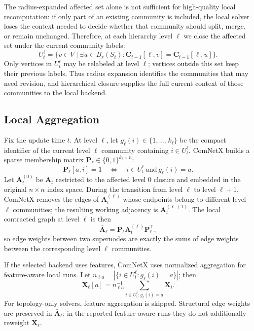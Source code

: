 \documentclass[conference]{IEEEtran}
\theoremstyle{definition}
\begin{document}
The radius-expanded affected set alone is not sufficient for high-quality local
recomputation: if only part of an existing community is included, the local
solver loses the context needed to decide whether that community should split,
merge, or remain unchanged. Therefore, at each hierarchy level $\ell$ we close
the affected set under the current community labels:
\begin{equation*}
U_t^\ell =
\{v\in V \mid \exists u\in B_r(S_t):
\mathbf{C}_{t-1}[\ell,v]=\mathbf{C}_{t-1}[\ell,u]\}.
\end{equation*}
Only vertices in $U_t^\ell$ may be relabeled at level $\ell$; vertices outside
this set keep their previous labels. Thus radius expansion identifies the
communities that may need revision, and hierarchical closure supplies the full
current context of those communities to the local backend.

\subsection{Local Aggregation}

Fix the update time $t$. At level $\ell$, let
$g_\ell(i)\in\{1,\ldots,k_\ell\}$ be the compact identifier of the current
level $\ell$ community containing $i\in U_t^\ell$. ComNetX builds a sparse
membership matrix $\mathbf{P}_\ell\in\{0,1\}^{k_\ell\times n}$:
\begin{equation*}
    \mathbf{P}_\ell[a,i]=1
    \quad\Longleftrightarrow\quad i\in U_t^\ell\ \text{and}\ g_\ell(i)=a .
\end{equation*}
Let $\mathbf{A}^{(0)}_t$ be $\mathbf{A}_t$ restricted to the affected
level 0 closure and embedded in the original $n\times n$ index space. During
the transition from level $\ell$ to level $\ell+1$, ComNetX removes the edges
of $\mathbf{A}^{(\ell)}_t$ whose endpoints belong to different level $\ell$
communities; the resulting working adjacency is $\mathbf{A}^{(\ell+1)}_t$.
The local contracted graph at level $\ell$ is then
\begin{equation*}
    \bar{\mathbf{A}}_\ell
    = \mathbf{P}_\ell \mathbf{A}^{(\ell)}_t \mathbf{P}_\ell^\top ,
\end{equation*}
so edge weights between two supernodes are exactly the sums of edge weights
between the corresponding level $\ell$ communities.

If the selected backend uses features, ComNetX uses normalized aggregation for
feature-aware local runs. Let
$n_{\ell a}=|\{i\in U_t^\ell:g_\ell(i)=a\}|$; then
\begin{equation*}
    \bar{\mathbf{X}}_\ell[a]
    =
    n_{\ell a}^{-1}\sum_{i\in U_t^\ell:g_\ell(i)=a}\mathbf{X}_i.
\end{equation*}
For topology-only solvers, feature aggregation is skipped. Structural edge
weights are preserved in $\bar{\mathbf{A}}_\ell$; in the reported feature-aware
runs they do not additionally reweight $\bar{\mathbf{X}}_\ell$.
\end{document}
